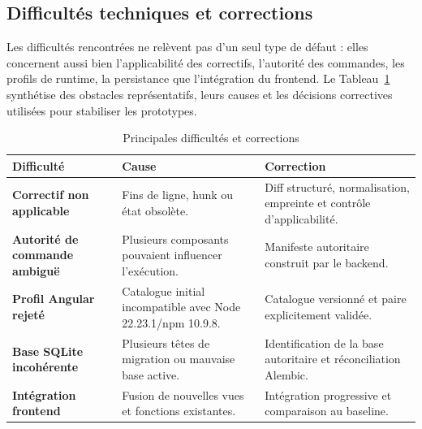 \subsection{Difficultés techniques et corrections}

Les difficultés rencontrées ne relèvent pas d'un seul type de défaut : elles concernent aussi bien l'applicabilité des correctifs, l'autorité des commandes, les profils de runtime, la persistance que l'intégration du frontend. Le Tableau~\ref{tab:difficultes-corrections-ch4} synthétise des obstacles représentatifs, leurs causes et les décisions correctives utilisées pour stabiliser les prototypes.

\begin{table}[H]
    \centering
    \caption{Principales difficultés et corrections}
    \label{tab:difficultes-corrections-ch4}
    \small
    \begin{tabularx}{\textwidth}{|>{\bfseries\RaggedRight\arraybackslash}p{3.6cm}|>{\RaggedRight\arraybackslash}p{4.5cm}|>{\RaggedRight\arraybackslash}X|}
        \hline
        \rowcolor{cgilight!95}
        \textbf{Difficulté} & \textbf{Cause} & \textbf{Correction} \\
        \hline
        Correctif non applicable & Fins de ligne, hunk ou état obsolète. & Diff structuré, normalisation, empreinte et contrôle d'applicabilité. \\
        \hline
        Autorité de commande ambiguë & Plusieurs composants pouvaient influencer l'exécution. & Manifeste autoritaire construit par le backend. \\
        \hline
        Profil Angular rejeté & Catalogue initial incompatible avec Node 22.23.1/npm 10.9.8. & Catalogue versionné et paire explicitement validée. \\
        \hline
        Base SQLite incohérente & Plusieurs têtes de migration ou mauvaise base active. & Identification de la base autoritaire et réconciliation Alembic. \\
        \hline
        Intégration frontend & Fusion de nouvelles vues et fonctions existantes. & Intégration progressive et comparaison au baseline. \\
        \hline
    \end{tabularx}
\end{table}

